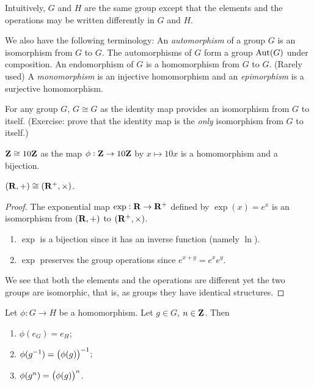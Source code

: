 Intuitively, $G$ and $H$ are the same group except that the elements and the operations may be written differently in $G$ and $H$.

We also have the following terminology: An \emph{automorphism} of a group $G$ is an isomorphism from $G$ to $G$. The automorphisms of $G$ form a group $\operatorname{Aut}(G)$ under composition. An endomorphism of $G$ is a homomorphism from $G$ to $G$. (Rarely used) A \emph{monomorphism} is an injective homomorphism and an \emph{epimorphism} is a surjective homomorphism.

\begin{example}
For any group $G$, $G\cong G$ as the identity map provides an isomorphism from $G$ to itself. (Exercise: prove that the identity map is the \emph{only} isomorphism from $G$ to itself.)

$\mathbf Z\cong10\mathbf Z$ as the map $\phi:\mathbf Z\to10\mathbf Z$ by $x\mapsto 10x$ is a homomorphism and a bijection.
\end{example}

\begin{example}
$(\mathbf R,+)\cong(\mathbf R^+,\times)$.

\begin{proof}
The exponential map $\exp:\mathbf R\to\mathbf R^+$ defined by $\exp(x)=e^x$ is an isomorphism from $(\mathbf R,+)$ to $(\mathbf R^+,\times)$.
\begin{enumerate}[label=(\roman*)]
\item $\exp$ is a bijection since it has an inverse function (namely $\ln$).
\item $\exp$ preserves the group operations since $e^{x+y}=e^xe^y$.
\end{enumerate}

We see that both the elements and the operations are different yet the two groups are isomorphic, that is, as groups they have identical structures.
\end{proof}
\end{example}

\begin{proposition}
Let $\phi:G\to H$ be a homomorphism. Let $g\in G$, $n\in\mathbf Z$. Then
\begin{enumerate}[label=(\roman*)]
\item $\phi(e_G)=e_H$;
\item $\phi(g^{-1})=\left(\phi(g)\right)^{-1}$;
\item $\phi(g^n)=\left(\phi(g)\right)^n$.
\end{enumerate}
\end{proposition}

